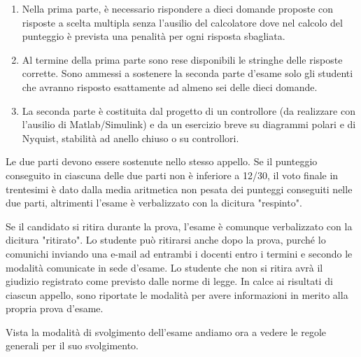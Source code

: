 \documentclass[../main.tex]{subfiles}
\begin{document}
\begin{enumerate}
	\item[\textbf{-}] Nella prima parte, è necessario rispondere a dieci domande proposte con risposte a scelta multipla senza l'ausilio del calcolatore dove nel calcolo del punteggio è prevista una penalità per ogni risposta sbagliata.
	
	\item[\textbf{-}] Al termine della prima parte sono rese disponibili le stringhe delle risposte corrette. Sono ammessi a sostenere la seconda parte d'esame solo gli studenti che avranno risposto esattamente ad almeno sei delle dieci domande.
	
	\item[\textbf{-}] La seconda parte è costituita dal progetto di un controllore (da realizzare con l'ausilio di Matlab/Simulink) e da un esercizio breve su diagrammi polari e di Nyquist, stabilità ad anello chiuso o su controllori.
	
\end{enumerate}

Le due parti devono essere sostenute nello stesso appello. Se il punteggio conseguito in ciascuna delle due parti non è inferiore a 12/30, il voto finale in trentesimi è dato dalla media aritmetica non pesata dei punteggi conseguiti nelle due parti, altrimenti l'esame è verbalizzato con la dicitura "respinto".

Se il candidato si ritira durante la prova, l'esame è comunque verbalizzato con la dicitura "ritirato". Lo studente può ritirarsi anche dopo la prova, purché lo comunichi inviando una e-mail ad entrambi i docenti entro i termini e secondo le modalità comunicate in sede d'esame. 
Lo studente che non si ritira avrà il giudizio registrato come previsto dalle norme di legge.
In calce ai risultati di ciascun appello, sono riportate le modalità per avere informazioni in merito alla propria prova d'esame.

Vista la modalità di svolgimento dell'esame andiamo ora a vedere le regole generali per il suo svolgimento.
\end{document}
